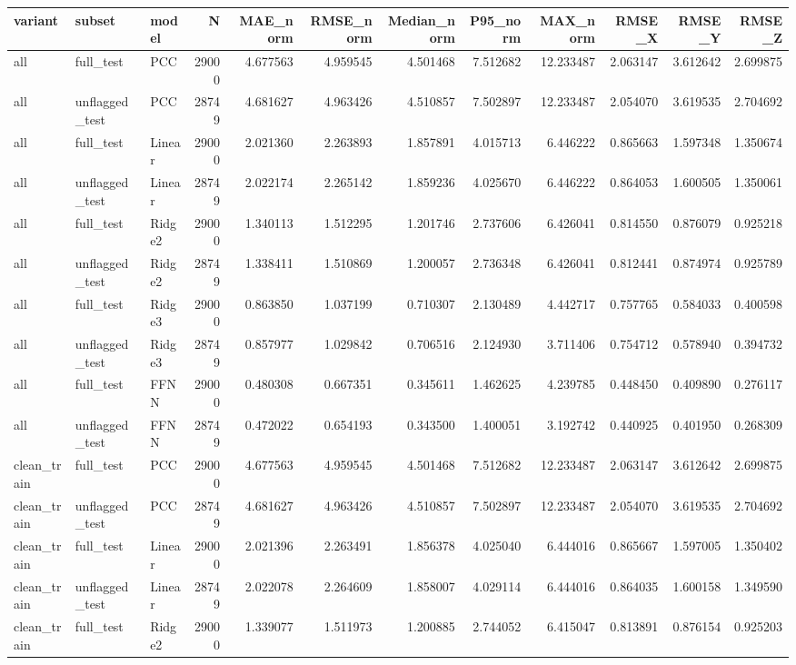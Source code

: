 \begin{tabular}{lllrrrrrrrrr}
\toprule
variant & subset & model & N & MAE_norm & RMSE_norm & Median_norm & P95_norm & MAX_norm & RMSE_X & RMSE_Y & RMSE_Z \\
\midrule
all & full_test & PCC & 29000 & 4.677563 & 4.959545 & 4.501468 & 7.512682 & 12.233487 & 2.063147 & 3.612642 & 2.699875 \\
all & unflagged_test & PCC & 28749 & 4.681627 & 4.963426 & 4.510857 & 7.502897 & 12.233487 & 2.054070 & 3.619535 & 2.704692 \\
all & full_test & Linear & 29000 & 2.021360 & 2.263893 & 1.857891 & 4.015713 & 6.446222 & 0.865663 & 1.597348 & 1.350674 \\
all & unflagged_test & Linear & 28749 & 2.022174 & 2.265142 & 1.859236 & 4.025670 & 6.446222 & 0.864053 & 1.600505 & 1.350061 \\
all & full_test & Ridge2 & 29000 & 1.340113 & 1.512295 & 1.201746 & 2.737606 & 6.426041 & 0.814550 & 0.876079 & 0.925218 \\
all & unflagged_test & Ridge2 & 28749 & 1.338411 & 1.510869 & 1.200057 & 2.736348 & 6.426041 & 0.812441 & 0.874974 & 0.925789 \\
all & full_test & Ridge3 & 29000 & 0.863850 & 1.037199 & 0.710307 & 2.130489 & 4.442717 & 0.757765 & 0.584033 & 0.400598 \\
all & unflagged_test & Ridge3 & 28749 & 0.857977 & 1.029842 & 0.706516 & 2.124930 & 3.711406 & 0.754712 & 0.578940 & 0.394732 \\
all & full_test & FFNN & 29000 & 0.480308 & 0.667351 & 0.345611 & 1.462625 & 4.239785 & 0.448450 & 0.409890 & 0.276117 \\
all & unflagged_test & FFNN & 28749 & 0.472022 & 0.654193 & 0.343500 & 1.400051 & 3.192742 & 0.440925 & 0.401950 & 0.268309 \\
clean_train & full_test & PCC & 29000 & 4.677563 & 4.959545 & 4.501468 & 7.512682 & 12.233487 & 2.063147 & 3.612642 & 2.699875 \\
clean_train & unflagged_test & PCC & 28749 & 4.681627 & 4.963426 & 4.510857 & 7.502897 & 12.233487 & 2.054070 & 3.619535 & 2.704692 \\
clean_train & full_test & Linear & 29000 & 2.021396 & 2.263491 & 1.856378 & 4.025040 & 6.444016 & 0.865667 & 1.597005 & 1.350402 \\
clean_train & unflagged_test & Linear & 28749 & 2.022078 & 2.264609 & 1.858007 & 4.029114 & 6.444016 & 0.864035 & 1.600158 & 1.349590 \\
clean_train & full_test & Ridge2 & 29000 & 1.339077 & 1.511973 & 1.200885 & 2.744052 & 6.415047 & 0.813891 & 0.876154 & 0.925203 \\

\end{tabular}

